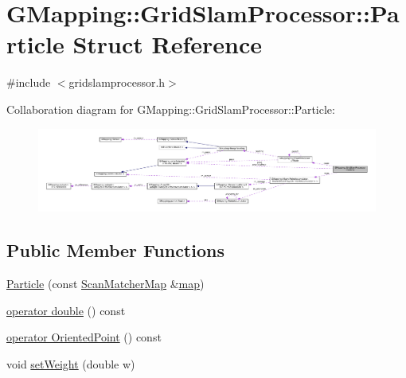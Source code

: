 \hypertarget{structGMapping_1_1GridSlamProcessor_1_1Particle}{}\section{G\+Mapping\+:\+:Grid\+Slam\+Processor\+:\+:Particle Struct Reference}
\label{structGMapping_1_1GridSlamProcessor_1_1Particle}


{\ttfamily \#include $<$gridslamprocessor.\+h$>$}



Collaboration diagram for G\+Mapping\+:\+:Grid\+Slam\+Processor\+:\+:Particle\+:
\nopagebreak
\begin{figure}[H]
\begin{center}
\leavevmode
\includegraphics[width=350pt]{structGMapping_1_1GridSlamProcessor_1_1Particle__coll__graph}
\end{center}
\end{figure}
\subsection*{Public Member Functions}
\begin{DoxyCompactItemize}
\item 
\hyperlink{structGMapping_1_1GridSlamProcessor_1_1Particle_a51dc73563ad5e3035f8cb3b51965854a}{Particle} (const \hyperlink{classGMapping_1_1Map}{Scan\+Matcher\+Map} \&\hyperlink{structGMapping_1_1GridSlamProcessor_1_1Particle_a33f1690ccf3a95622e0246e75f5af145}{map})
\item 
\hyperlink{structGMapping_1_1GridSlamProcessor_1_1Particle_a0b78d91dc4d41c565c388fe7320603b3}{operator double} () const
\item 
\hyperlink{structGMapping_1_1GridSlamProcessor_1_1Particle_a4538a813d749fadc1ba922858cdd8d7f}{operator Oriented\+Point} () const
\item 
void \hyperlink{structGMapping_1_1GridSlamProcessor_1_1Particle_a07888ebc307fab0bfee912bbfda45832}{set\+Weight} (double w)
\end{DoxyCompactItemize}
